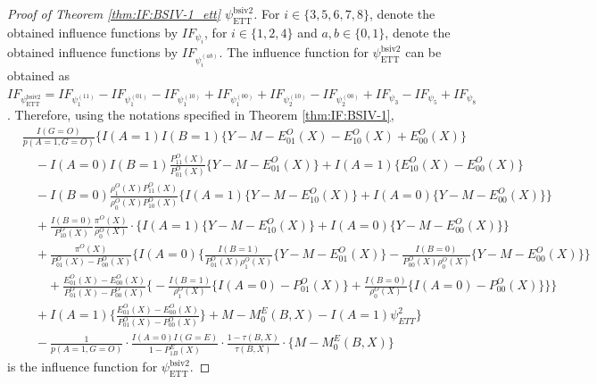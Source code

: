 \documentclass[10pt]{article}
\begin{document}
\begin{proof}[Proof of Theorem \ref{thm:IF:BSIV-1_ett} $\psi_{\text{ETT}}^{\text{bsiv2}}$]
For $i\in\{3,5,6,7,8\}$, denote the obtained influence functions by $IF_{\psi_i}$, for $i\in\{1,2,4\}$ and $a,b\in\{0,1\}$, denote the obtained influence functions by $IF_{\psi_i^{(ab)}}$. The influence function for $\psi_{\text{ETT}}^{\text{bsiv2}}$ can be obtained as $IF_{\psi_{\text{ETT}}^{\text{bsiv2}}}=IF_{\psi_1^{(11)}}-IF_{\psi_1^{(01)}}-IF_{\psi_1^{(10)}}+IF_{\psi_1^{(00)}}+IF_{\psi_2^{(10)}}-IF_{\psi_2^{(00)}}+IF_{\psi_3}-IF_{\psi_5}+IF_{\psi_8}$. Therefore, using the notations specified in Theorem \ref{thm:IF:BSIV-1},
{\footnotesize \begin{align*}
&\frac{I(G=O)}{p(A=1,G=O)}\Bigg\{I(A=1)I(B=1)\{Y-M-E_{01}^O(X)-E_{10}^O(X)+E_{00}^O(X)\}\\
&\quad-I(A=0)I(B=1)\frac{P_{11}^O(X)}{P_{01}^O(X)}\{Y-M-E_{01}^O(X)\}+I(A=1)\{E_{10}^O(X)-E_{00}^O(X)\}\\
&\quad-I(B=0)\frac{\rho_{1}^O(X)P_{11}^O(X)}{\rho_{0}^O(X)P_{10}^O(X)}\big\{I(A=1)\{Y-M-E_{10}^O(X)\}+I(A=0)\{Y-M-E_{00}^O(X)\}\big\}\\
&\quad+\frac{I(B=0)}{P_{10}^O(X)}\frac{\pi^O(X)}{\rho_{0}^O(X)}\cdot\big\{I(A=1)\{Y-M-E_{10}^O(X)\}+I(A=0)\{Y-M-E_{00}^O(X)\}\big\}\\
&\quad+\frac{\pi^O(X)}{P_{01}^O(X)-P_{00}^O(X)}\Big\{I(A=0)\big\{\frac{I(B=1)}{P_{01}^O(X)\rho_1^O(X)}\{Y-M-E_{01}^O(X)\}-\frac{I(B=0)}{P_{00}^O(X)\rho_0^O(X)}\{Y-M-E_{00}^O(X)\}\big\}\\
&\quad\quad+\frac{E_{01}^O(X)-E_{00}^O(X)}{P_{01}^O(X)-P_{00}^O(X)}\big\{-\frac{I(B=1)}{\rho_1^O(X)}\{I(A=0)-P_{01}^O(X)\}+\frac{I(B=0)}{\rho_0^O(X)}\{I(A=0)-P_{00}^O(X)\}\big\}\Big\}\\
&\quad+I(A=1)\{\frac{E_{01}^O(X)-E_{00}^O(X)}{P_{01}^O(X)-P_{00}^O(X)}\}+M-M_0^E(B,X)-I(A=1)\psi^2_{ETT}\Bigg\}\\
&\quad-\frac{1}{p(A=1,G=O)}\cdot\frac{I(A=0)I(G=E)}{1-P_{1B}^E(X)}\cdot\frac{1-\tau(B,X)}{\tau(B,X)}\cdot\{M-M_0^E(B,X)\}
\end{align*}}
is the influence function for $\psi_{\text{ETT}}^{\text{bsiv2}}$.

\end{proof}
\end{document}
